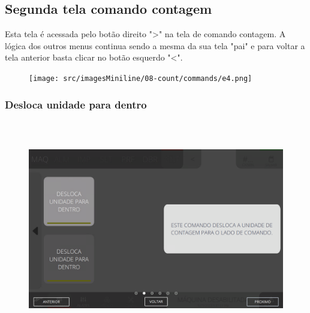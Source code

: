 \newpage
\thispagestyle{fancy}
\vspace*{40 pt}
\subsection{Segunda tela comando contagem}\label{miniTegundaTelaComandoContagem}
Esta tela é acessada pelo botão direito "\textgreater" na tela de comando contagem. A lógica dos outros menus continua sendo a mesma da sua tela "pai" e para voltar a tela anterior basta clicar no botão esquerdo "\textless{}".
\vspace*{\fill}
\begin{figure}[h]
  \centering
  \texttt{[image: src/imagesMiniline/08-count/commands/e4.png]}
\end{figure}
\vspace*{\fill}

\newpage
\thispagestyle{fancy}
\vspace*{40 pt}
\subsubsection{\small{Desloca unidade para dentro}}\label{miniTelaComandoContagemDeslocaUnidadeParaDentro}
\vspace*{\fill}
\begin{figure}[h]
  \centering
  \includegraphics[width=576px,height=360px]{src/imagesFlexo/08-count/commands/e-9.png}
\end{figure}
\vspace*{\fill}

\newpage
\thispagestyle{fancy}
\vspace*{40 pt}
